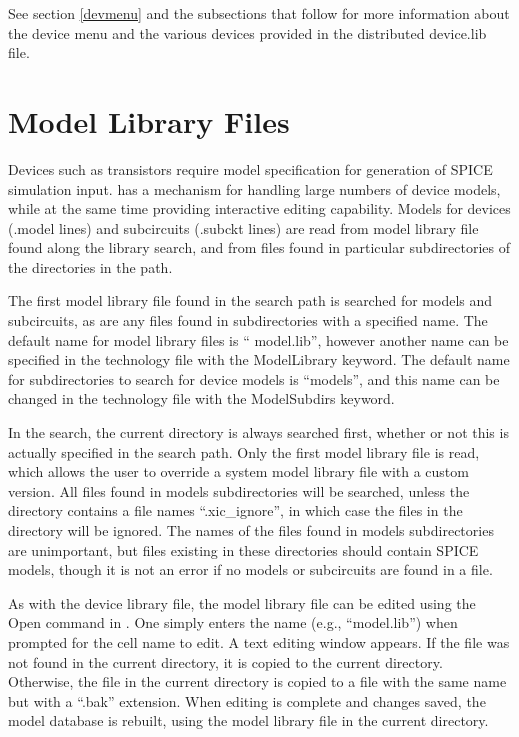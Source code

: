 See section \ref{devmenu} and the subsections that follow for more
information about the device menu and the various devices provided
in the distributed {\vt device.lib} file.
 

\section{Model Library Files}

Devices such as transistors require model specification for generation
of SPICE simulation input.  {\Xic} has a mechanism for handling large
numbers of device models, while at the same time providing interactive
editing capability.  Models for devices ({\vt .model} lines) and
subcircuits ({\vt .subckt} lines) are read from model library file
found along the library search, and from files found in particular
subdirectories of the directories in the path.

The first model library file found in the search path is searched for
models and subcircuits, as are any files found in subdirectories with
a specified name.  The default name for model library files is ``{\vt
model.lib}'', however another name can be specified in the technology
file with the {\vt ModelLibrary} keyword.  The default name for
subdirectories to search for device models is ``{\vt models}'', and
this name can be changed in the technology file with the {\vt
ModelSubdirs} keyword.

In the search, the current directory is always searched first, whether
or not this is actually specified in the search path.  Only the first
model library file is read, which allows the user to override a system
model library file with a custom version.  All files found in {\vt
models} subdirectories will be searched, unless the directory contains
a file names ``{\vt .xic\_ignore}'', in which case the files in the
directory will be ignored.  The names of the files found in {\vt
models} subdirectories are unimportant, but files existing in these
directories should contain SPICE models, though it is not an error if
no models or subcircuits are found in a file.

As with the device library file, the model library file can be edited
using the {\cb Open} command in {\Xic}.  One simply enters the name
(e.g., ``{\vt model.lib}'') when prompted for the cell name to edit. 
A text editing window appears.  If the file was not found in the
current directory, it is copied to the current directory.  Otherwise,
the file in the current directory is copied to a file with the same
name but with a ``{\vt .bak}'' extension.  When editing is complete
and changes saved, the model database is rebuilt, using the model
library file in the current directory.

